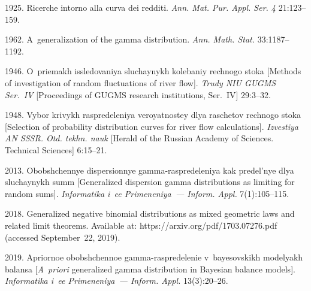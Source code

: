 \vspace*{-1pt}

  \begin{multicols}{2}

\renewcommand{\bibname}{\protect\rmfamily References}

{\small\frenchspacing
 {%
 \begin{thebibliography}{99}
 
 \vspace*{-2pt}

 1925. Ricerche intorno alla curva dei redditi. 
\textit{Ann. Mat. Pur. Appl. Ser. 4} 21:123--159.

 1962. A~generalization of the gamma distribution. 
\textit{Ann. Math. Stat.} 33:1187--1192.

 1946. 
O~priemakh issledovaniya sluchaynykh kolebaniy rechnogo stoka 
[Methods of investigation of random fluctuations of river flow]. 
\textit{Trudy NIU GUGMS Ser.~IV} 
[Proceedings of GUGMS research institutions, Ser.~IV] 29:3--32.

 1948. 
Vybor krivykh raspredeleniya veroyatnostey dlya raschetov rechnogo stoka 
[Selection of probability distribution curves for river flow calculations].
\textit{Izvestiya AN SSSR. Otd. tekhn. nauk}
[Herald of the Russian Academy of Sciences. Technical Sciences] 6:15--21.

2013. Obobshchennye dispersionnye gamma-raspredeleniya kak predel'nye 
dlya sluchaynykh summ [Generalized dispersion gamma distributions 
as limiting for random sums]. 
\textit{Informatika i~ee Primeneniya~--- Inform. Appl.} 7(1):105--115.

 2018. Generalized negative binomial distributions as mixed geometric 
 laws and related limit theorems. Available at: 
 {\sf https://arxiv.org/pdf/1703.07276.pdf} (accessed September~22, 2019).

 2019. Apriornoe obobshchennoe gamma-raspredelenie 
 v~bayesovskikh modelyakh balansa [\textit{A~priori} generalized gamma distribution in 
 Bayesian balance models]. \textit{Informatika i~ee Primeneniya~--- Inform. Appl.}
 13(3):20--26.


\end{thebibliography}}}
\end{multicols}
